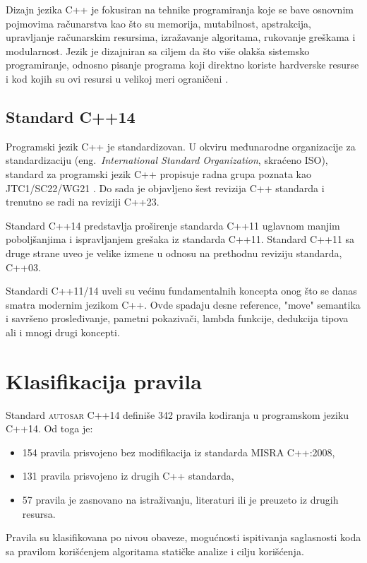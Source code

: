 \documentclass[12pt,oneside]{memoir}
\begin{document}
Dizajn jezika C++ je fokusiran na tehnike programiranja koje se bave osnovnim pojmovima ra\v{c}unarstva kao \v{s}to su memorija, mutabilnost, apstrakcija, upravljanje ra\v{c}unarskim resursima, izra\v{z}avanje algoritama, rukovanje gre\v{s}kama i modularnost. Jezik je dizajniran sa ciljem da \v{s}to vi\v{s}e olak\v{s}a sistemsko programiranje, odnosno pisanje programa koji direktno koriste hardverske resurse i kod kojih su ovi resursi u velikoj meri ograni\v{c}eni \cite{TheC++ProgrammingLanguage}.


\subsection{Standard C++14}

Programski jezik C++ je standardizovan. U okviru međunarodne organizacije za standardizaciju (eng.~\textit{International Standard Organization}, skra\'{c}eno ISO), standard za programski jezik C++ propisuje radna grupa poznata kao JTC1/SC22/WG21 \cite{ISOWebsite}. Do sada je objavljeno \v{s}est revizija C++ standarda i trenutno se radi na reviziji C++23. 
\indent

Standard C++14 predstavlja pro\v{s}irenje standarda C++11 uglavnom manjim pobolj\v{s}anjima i ispravljanjem gre\v{s}aka iz standarda C++11. Standard C++11 sa druge strane uveo je velike izmene u odnosu na prethodnu reviziju standarda, C++03. \par
Standardi C++11/14 uveli su ve\'{c}inu fundamentalnih koncepta onog \v{s}to se danas smatra modernim jezikom C++. Ovde spadaju desne reference, "move" semantika i savr\v{s}eno prosleđivanje, pametni pokaziva\v{c}i, lambda funkcije, dedukcija tipova ali i mnogi drugi koncepti.

\section{Klasifikacija pravila}
\label{sec:klasifikacija}

Standard \textsc{autosar} C++14 definiše 342 pravila kodiranja u programskom jeziku C++14. Od toga je:
\begin{itemize}
  \item {154 pravila prisvojeno bez modifikacija iz standarda MISRA C++:2008,}
  \item {131 pravila prisvojeno iz drugih C++ standarda,}
  \item {57 pravila je zasnovano na istraživanju, literaturi ili je preuzeto iz drugih resursa.}
\end{itemize}
Pravila su klasifikovana po nivou obaveze, mogućnosti ispitivanja saglasnosti koda sa pravilom korišćenjem algoritama
statičke analize i cilju korišćenja.
\end{document}
